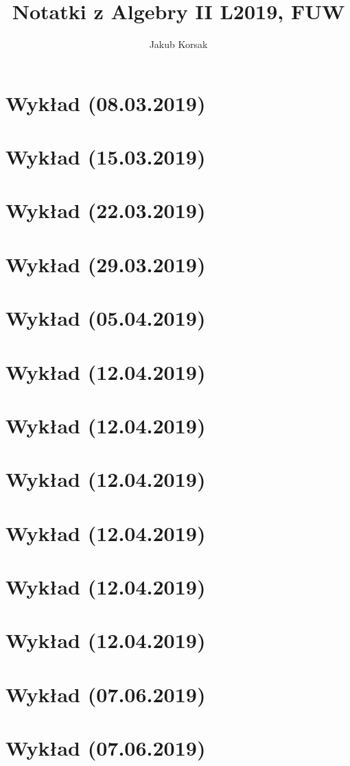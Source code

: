 \documentclass{article}
\title{Notatki z Algebry II L2019, FUW}
\author{Jakub Korsak}
\begin{document}
\maketitle

\pagebreak
\section{Wykład (08.03.2019)}

\pagebreak
\section{Wykład (15.03.2019)}

\pagebreak
\section{Wykład (22.03.2019)}

\pagebreak
\section{Wykład (29.03.2019)}

\pagebreak
\section{Wykład (05.04.2019)}

\pagebreak
\section{Wykład (12.04.2019)}

\pagebreak
\section{Wykład (12.04.2019)}

\pagebreak
\section{Wykład (12.04.2019)}

\pagebreak
\section{Wykład (12.04.2019)}

\pagebreak
\section{Wykład (12.04.2019)}

\pagebreak
\section{Wykład (12.04.2019)}

\pagebreak
\section{Wykład (07.06.2019)}

\pagebreak
\section{Wykład (07.06.2019)}

\end{document}
